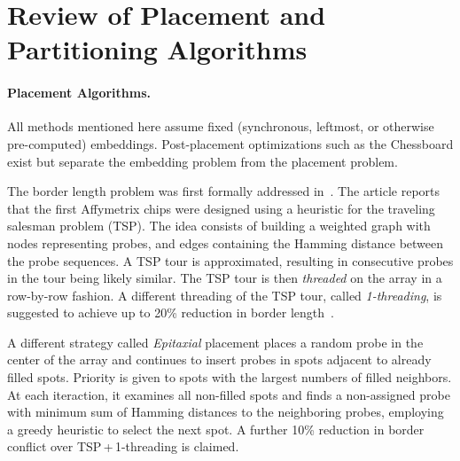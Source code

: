 \documentclass[english]{lni}
\newcommand{\ignore}[1]{}
\begin{document}
\section{Review of Placement and Partitioning Algorithms}
\label{sec:previous_work}
\ignore{
We now review existing algorithms for microarray layout design. We note that
the placement can be handled by (recursively) partitioning the chip into smaller
regions before applying a placement algorithm. 
Post-placement optimizations such
as the Chessboard \cite{KAHNG02} are not covered.

The first to formally address the border length problem were
\cite{FELDMAN93}. They showed how an optimal placement can be constructed based
on a two-dimensional Gray code. However, their work is restricted to
\emph{uniform arrays} (arrays containing all possible probes of a given length)
and synchronous embeddings.}
\paragraph{Placement Algorithms.}
All methods mentioned here assume fixed (synchronous, leftmost, or
otherwise pre-computed) embeddings. Post-placement optimizations such
as the Chessboard \cite{KAHNG02} exist but separate the embedding problem from the
placement problem.

The border length problem
was first formally addressed in~\cite{HANNENHALLI02}. The article reports that
the first Affymetrix chips were designed using a heuristic for the traveling
salesman problem (TSP). The idea consists of building a weighted graph with
nodes representing probes, and edges containing the Hamming distance between
the probe sequences. A TSP tour is approximated, resulting in consecutive
probes in the tour being likely similar. The TSP tour is then
\emph{threaded} on the array in a row-by-row fashion. A different threading of
the TSP tour, called \emph{1-threading}, is suggested to achieve
up to 20\% reduction in border length~\cite{HANNENHALLI02}.

A different strategy called \emph{Epitaxial} placement
\cite{KAHNG02} places a random probe in the center of the array and continues
to insert probes in spots adjacent to already filled spots. Priority is given
to spots with the largest numbers of filled neighbors. At each iteraction, it
examines all non-filled spots and finds a non-assigned probe with
minimum sum of Hamming distances to the neighboring probes, employing
a greedy heuristic to select the next spot.  A further 10\% reduction in
border conflict over TSP\,+\,1-threading is claimed.
\end{document}
